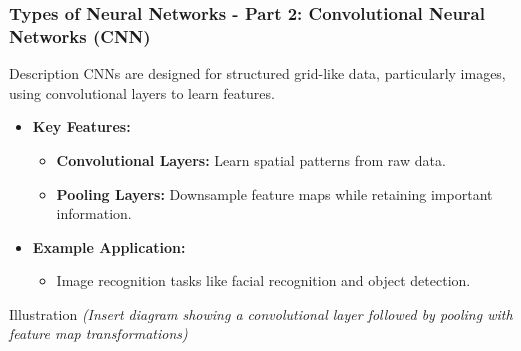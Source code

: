 \documentclass[aspectratio=169]{beamer}
\begin{document}
\begin{frame}[fragile]
  \frametitle{Types of Neural Networks - Part 2: Convolutional Neural Networks (CNN)}
  \begin{block}{Description}
    CNNs are designed for structured grid-like data, particularly images, using convolutional layers to learn features.
  \end{block}

  \begin{itemize}
    \item \textbf{Key Features:}
      \begin{itemize}
        \item \textbf{Convolutional Layers:} Learn spatial patterns from raw data.
        \item \textbf{Pooling Layers:} Downsample feature maps while retaining important information.
      \end{itemize}

    \item \textbf{Example Application:}
      \begin{itemize}
        \item Image recognition tasks like facial recognition and object detection.
      \end{itemize}
  \end{itemize}
  
  \begin{block}{Illustration}
    \textit{(Insert diagram showing a convolutional layer followed by pooling with feature map transformations)}
  \end{block}
\end{frame}
\end{document}
